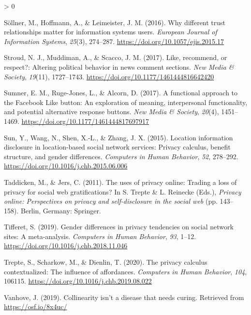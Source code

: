 \documentclass[
  english,
  man,floatsintext]{apa6}
\newlength{\cslhangindent}
\newenvironment{CSLReferences}[2] %
 {%
  \setlength{\parindent}{0pt}
  \ifodd #1 \everypar{\setlength{\hangindent}{\cslhangindent}}\ignorespaces\fi
  \ifnum #2 > 0
  \setlength{\parskip}{#2\baselineskip}
  \fi
 }%
 {}
\begin{document}
\begin{CSLReferences}{1}{0}
\leavevmode\hypertarget{ref-sollnerWhyDifferentTrust2016}{}%
Söllner, M., Hoffmann, A., \& Leimeister, J. M. (2016). Why different trust relationships matter for information systems users. \emph{European Journal of Information Systems}, \emph{25}(3), 274--287. \url{https://doi.org/10.1057/ejis.2015.17}

\leavevmode\hypertarget{ref-stroudRecommendRespectAltering2017}{}%
Stroud, N. J., Muddiman, A., \& Scacco, J. M. (2017). Like, recommend, or respect?: {Altering} political behavior in news comment sections. \emph{New Media \& Society}, \emph{19}(11), 1727--1743. \url{https://doi.org/10.1177/1461444816642420}

\leavevmode\hypertarget{ref-sumnerFunctionalApproachFacebook2017}{}%
Sumner, E. M., Ruge-Jones, L., \& Alcorn, D. (2017). A functional approach to the {Facebook} {Like} button: {An} exploration of meaning, interpersonal functionality, and potential alternative response buttons. \emph{New Media \& Society}, \emph{20}(4), 1451--1469. \url{https://doi.org/10.1177/1461444817697917}

\leavevmode\hypertarget{ref-sunLocationInformationDisclosure2015}{}%
Sun, Y., Wang, N., Shen, X.-L., \& Zhang, J. X. (2015). Location information disclosure in location-based social network services: {Privacy} calculus, benefit structure, and gender differences. \emph{Computers in Human Behavior}, \emph{52}, 278--292. \url{https://doi.org/10.1016/j.chb.2015.06.006}

\leavevmode\hypertarget{ref-taddickenUsesPrivacyOnline2011}{}%
Taddicken, M., \& Jers, C. (2011). The uses of privacy online: {Trading} a loss of privacy for social web gratifications? In S. Trepte \& L. Reinecke (Eds.), \emph{Privacy online: {Perspectives} on privacy and self-disclosure in the social web} (pp. 143--158). Berlin, Germany: Springer.

\leavevmode\hypertarget{ref-tifferetGenderDifferencesPrivacy2019}{}%
Tifferet, S. (2019). Gender differences in privacy tendencies on social network sites: {A} meta-analysis. \emph{Computers in Human Behavior}, \emph{93}, 1--12. \url{https://doi.org/10.1016/j.chb.2018.11.046}

\leavevmode\hypertarget{ref-treptePrivacyCalculusContextualized2020}{}%
Trepte, S., Scharkow, M., \& Dienlin, T. (2020). The privacy calculus contextualized: {The} influence of affordances. \emph{Computers in Human Behavior}, \emph{104}, 106115. \url{https://doi.org/10.1016/j.chb.2019.08.022}

\leavevmode\hypertarget{ref-vanhoveCollinearityIsnDisease2019}{}%
Vanhove, J. (2019). Collinearity isn't a disease that needs curing. Retrieved from \url{https://osf.io/8x4uc/}


\end{CSLReferences}
\end{document}
